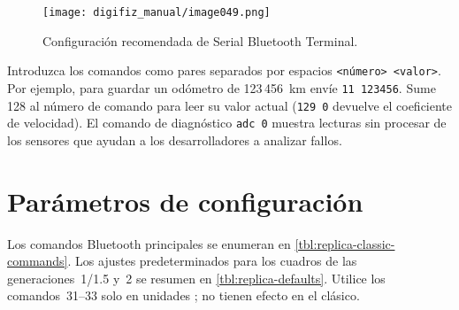 \begin{figure}[htbp]
    \centering
    \texttt{[image: digifiz\_manual/image049.png]}
    \caption{Configuración recomendada de Serial Bluetooth Terminal.}
    \label{fig:sbt-settings}
\end{figure}

Introduzca los comandos como pares separados por espacios \verb|<número> <valor>|. Por ejemplo, para guardar un odómetro de 123\,456~km envíe \verb|11 123456|. Sume 128 al número de comando para leer su valor actual (\verb|129 0| devuelve el coeficiente de velocidad). El comando de diagnóstico \verb|adc 0| muestra lecturas sin procesar de los sensores que ayudan a los desarrolladores a analizar fallos.

\section{Parámetros de configuración}
Los comandos Bluetooth principales se enumeran en \autoref{tbl:replica-classic-commands}. Los ajustes predeterminados para los cuadros de las generaciones~1/1.5 y~2 se resumen en \autoref{tbl:replica-defaults}. Utilice los comandos~31--33 solo en unidades \ReplicaNextShort{}; no tienen efecto en el \ReplicaGenOneShort{} clásico.

